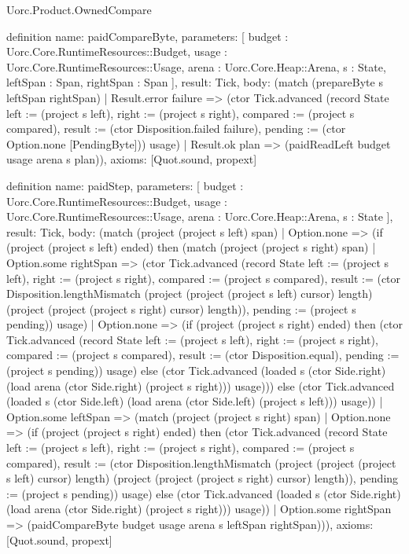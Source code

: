 \begin{lexlean}{Uorc.Product.OwnedCompare}
\begin{semanticmodule}
definition{
  name: paidCompareByte,
  parameters: [
    budget : Uorc.Core.RuntimeResources::Budget,
    usage : Uorc.Core.RuntimeResources::Usage,
    arena : Uorc.Core.Heap::Arena,
    s : State,
    leftSpan : Span,
    rightSpan : Span
  ],
  result: Tick,
  body: (match (prepareByte s leftSpan rightSpan)
    | Result.error failure => (ctor Tick.advanced (record State {left := (project s left), right := (project s right), compared := (project s compared), result := (ctor Disposition.failed failure), pending := (ctor Option.none [PendingByte])}) usage)
    | Result.ok plan => (paidReadLeft budget usage arena s plan)),
  axioms: [Quot.sound, propext]
}

definition{
  name: paidStep,
  parameters: [
    budget : Uorc.Core.RuntimeResources::Budget,
    usage : Uorc.Core.RuntimeResources::Usage,
    arena : Uorc.Core.Heap::Arena,
    s : State
  ],
  result: Tick,
  body: (match (project (project s left) span)
    | Option.none => (if (project (project s left) ended) then (match (project (project s right) span)
      | Option.some rightSpan => (ctor Tick.advanced (record State {left := (project s left), right := (project s right), compared := (project s compared), result := (ctor Disposition.lengthMismatch (project (project (project s left) cursor) length) (project (project (project s right) cursor) length)), pending := (project s pending)}) usage)
      | Option.none => (if (project (project s right) ended) then (ctor Tick.advanced (record State {left := (project s left), right := (project s right), compared := (project s compared), result := (ctor Disposition.equal), pending := (project s pending)}) usage) else (ctor Tick.advanced (loaded s (ctor Side.right) (load arena (ctor Side.right) (project s right))) usage))) else (ctor Tick.advanced (loaded s (ctor Side.left) (load arena (ctor Side.left) (project s left))) usage))
    | Option.some leftSpan => (match (project (project s right) span)
      | Option.none => (if (project (project s right) ended) then (ctor Tick.advanced (record State {left := (project s left), right := (project s right), compared := (project s compared), result := (ctor Disposition.lengthMismatch (project (project (project s left) cursor) length) (project (project (project s right) cursor) length)), pending := (project s pending)}) usage) else (ctor Tick.advanced (loaded s (ctor Side.right) (load arena (ctor Side.right) (project s right))) usage))
      | Option.some rightSpan => (paidCompareByte budget usage arena s leftSpan rightSpan))),
  axioms: [Quot.sound, propext]
}


\end{semanticmodule}
\end{lexlean}
